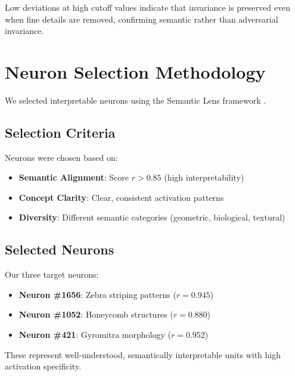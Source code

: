 \documentclass[licencjacka,en]{pracamgr}
\begin{document}
Low deviations at high cutoff values indicate that invariance is preserved even when fine details are removed, confirming semantic rather than adversarial invariance.

\section{Neuron Selection Methodology}\label{appendix:neuron_selection}

We selected interpretable neurons using the Semantic Lens framework \citep{dreyer2025mechanisticunderstandingvalidationlarge}.

\subsection{Selection Criteria}

Neurons were chosen based on:
\begin{itemize}
\item \textbf{Semantic Alignment}: Score $r > 0.85$ (high interpretability)
\item \textbf{Concept Clarity}: Clear, consistent activation patterns
\item \textbf{Diversity}: Different semantic categories (geometric, biological, textural)
\end{itemize}

\subsection{Selected Neurons}

Our three target neurons:
\begin{itemize}
\item \textbf{Neuron \#1656}: Zebra striping patterns ($r = 0.945$)
\item \textbf{Neuron \#1052}: Honeycomb structures ($r = 0.880$)
\item \textbf{Neuron \#421}: Gyromitra morphology ($r = 0.952$)
\end{itemize}

These represent well-understood, semantically interpretable units with high activation specificity.


\end{document}

